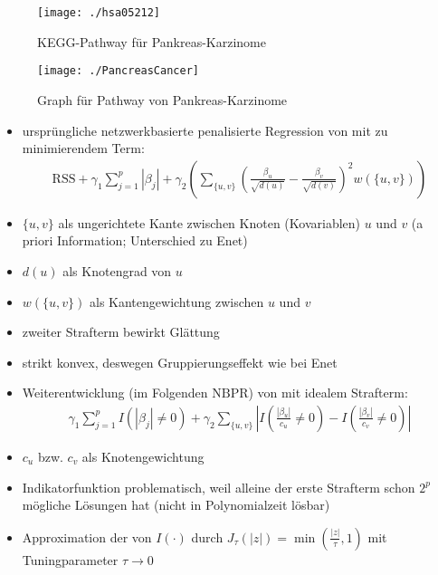 \documentclass{beamer}
\begin{document}
\begin{frame}
\begin{figure}
\centering
\texttt{[image: ./hsa05212]}
\caption{KEGG-Pathway für Pankreas-Karzinome}
\label{fig:hsa05212}
\end{figure}
\end{frame}


\begin{frame}
\begin{figure}
\centering
\texttt{[image: ./PancreasCancer]}
\caption{Graph für Pathway von Pankreas-Karzinome}
\label{fig:pancreas}
\end{figure}
\end{frame}



\begin{frame}
	\begin{itemize}
	\item ursprüngliche netzwerkbasierte penalisierte Regression von \cite{li_network-constrained_2008} mit zu minimierendem Term:
	\begin{align*}
	\text{RSS}
	+\gamma_1\sum_{j=1}^{p}|\beta_j|
	+\gamma_2 \left( \sum_{\{u,v\}} \left(\frac{\beta_u}{\sqrt{d(u)}}-\frac{\beta_v}{\sqrt{d(v)}}\right)^2 w(\{u,v\})\right)
	\end{align*}
	\item $\{u,v\}$ als ungerichtete Kante zwischen Knoten (Kovariablen) $u$ und $v$ (a priori Information; Unterschied zu Enet)
	\item $d(u)$ als Knotengrad von $u$
	\item $w(\{u,v\})$ als Kantengewichtung zwischen $u$ und $v$
	\item zweiter Strafterm bewirkt Glättung
	\item strikt konvex, deswegen Gruppierungseffekt wie bei Enet
	\end{itemize}
\end{frame}


\begin{frame}
	\begin{itemize}
	\item Weiterentwicklung (im Folgenden $\text{NBPR}$) von \cite{kim_network-based_2013} mit {\glqq}idealem{\grqq} Strafterm:
	\begin{align*}
	\gamma_1 \sum_{j=1}^{p}I(|\beta_j|\neq 0) + \gamma_2 \sum_{\{u,v\}}\left| I\left( \frac{|\beta_u|}{c_u} \neq 0 \right) - I\left( \frac{|\beta_v|}{c_v} \neq 0 \right) \right|
	\end{align*}
	\item $c_u$ bzw. $c_v$ als Knotengewichtung
	\item Indikatorfunktion problematisch, weil
	alleine der erste Strafterm schon $2^p$ mögliche Lösungen hat (nicht in Polynomialzeit lösbar)
	\item Approximation der von $I(\cdot)$ durch  $J_\tau(|z|)=\min (\frac{|z|}{\tau}, 1)$ mit Tuningparameter $\tau \rightarrow 0$
	\end{itemize}
\end{frame}
\end{document}
